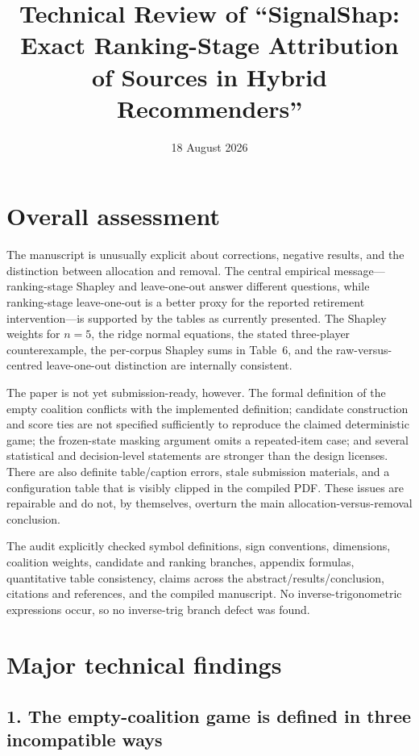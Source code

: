 \documentclass[11pt]{article}
\title{Technical Review of ``SignalShap: Exact Ranking-Stage Attribution of Sources in Hybrid Recommenders''}
\author{}
\date{18 August 2026}
\begin{document}
\maketitle

\section*{Overall assessment}

The manuscript is unusually explicit about corrections, negative results, and the distinction between allocation and removal.  The central empirical message---ranking-stage Shapley and leave-one-out answer different questions, while ranking-stage leave-one-out is a better proxy for the reported retirement intervention---is supported by the tables as currently presented.  The Shapley weights for $n=5$, the ridge normal equations, the stated three-player counterexample, the per-corpus Shapley sums in Table~6, and the raw-versus-centred leave-one-out distinction are internally consistent.

The paper is not yet submission-ready, however.  The formal definition of the empty coalition conflicts with the implemented definition; candidate construction and score ties are not specified sufficiently to reproduce the claimed deterministic game; the frozen-state masking argument omits a repeated-item case; and several statistical and decision-level statements are stronger than the design licenses.  There are also definite table/caption errors, stale submission materials, and a configuration table that is visibly clipped in the compiled PDF.  These issues are repairable and do not, by themselves, overturn the main allocation-versus-removal conclusion.

The audit explicitly checked symbol definitions, sign conventions, dimensions, coalition weights, candidate and ranking branches, appendix formulas, quantitative table consistency, claims across the abstract/results/conclusion, citations and references, and the compiled manuscript.  No inverse-trigonometric expressions occur, so no inverse-trig branch defect was found.

\section*{Major technical findings}

\subsection*{1. The empty-coalition game is defined in three incompatible ways}
\end{document}
